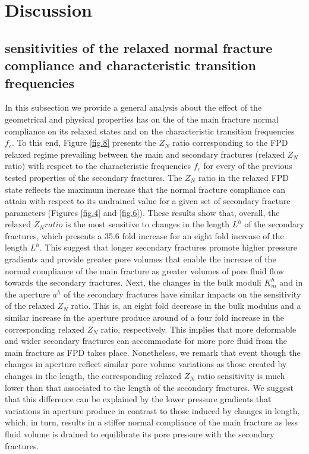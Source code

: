 \documentclass[draft]{agujournal2019}
\begin{document}
\section{Discussion}
\subsection{sensitivities of the relaxed normal fracture compliance and  characteristic transition frequencies}
In this subsection we provide a general analysis about the effect of the geometrical and physical properties has on the of the main fracture normal compliance on its relaxed states and on the characteristic transition frequencies $f_c$. To this end, Figure \ref{fig.8} presents the $Z_N$ ratio corresponding to the FPD relaxed regime prevailing between the main and secondary fractures (relaxed $Z_N$ ratio)
with respect to the characteristic frequencies $f_c$ for every of the previous tested properties of the secondary fractures. The  $Z_N$ ratio in the relaxed  FPD state reflects the maximum increase that the normal fracture compliance can attain with respect to its undrained value for a given set of secondary fracture parameters (Figures \ref{fig.4} and  \ref{fig.6}).
These results show that, overall, the relaxed $Z_N ratio $ is the most sensitive to changes in the length $L^h$ of the secondary fractures, which presents a 35.6 fold increase for an eight fold increase of the length $L^h$.  This suggest that longer secondary fractures promote higher pressure gradients and provide greater pore volumes that enable the increase of the normal compliance of the main fracture as greater volumes of pore fluid flow towards the secondary fractures. Next, the changes in the bulk moduli $K_m^h$  and  in the aperture $a^h$  of the secondary fractures have similar impacts on the sensitivity of the relaxed  $Z_N$ ratio. This is, an eight fold decrease in the bulk modulus and a similar increase in the aperture produce around of a four fold increase in the corresponding relaxed $Z_N$ ratio, respectively. This implies that more deformable and wider secondary fractures can accommodate for more pore fluid from the main fracture as FPD takes place. Nonetheless, we remark that event though the changes in aperture reflect similar pore volume variations as those created by changes in the length, the corresponding relaxed $Z_N$ ratio sensitivity is much lower than that associated to the length of the secondary fractures. We suggest that this difference can be explained by the lower pressure gradients that variations in aperture produce in contrast to those induced by changes in length, which, in turn, results in a stiffer normal compliance of the main fracture as less fluid volume is drained to equilibrate its pore pressure with the secondary fractures. 
\end{document}
